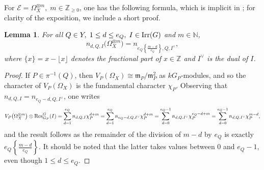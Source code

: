 \documentclass[10pt]{amsart}
\newtheorem{lemma}[theorem]{Lemma}
\theoremstyle{definition}
\begin{document}
 For $\mathcal{E}=\Omega_X^{\otimes m},\;m\in\mathbb{Z}_{\geq 0}$, one has the following formula, which is 
implicit in \cite[3.9]{MR589254}; for clarity of the exposition, we include a short proof.
\begin{lemma}\label{lem:nomega}
For all $Q\in Y,\;1\leq d\leq e_Q,\; I\in{\rm Irr}(G)$ and $m\in\mathbb{N}$,
\[
n_{d,Q,I}\big(\Omega_X^{\otimes m}\big)=n_{e_Q\left\{\frac{m-d}{e_Q}\right\},Q,I^\vee},
\]
where $\{ x\}=x-\lfloor x \rfloor$ denotes the fractional part of $x\in\mathbb{Z}$ and $I^\vee$ is the dual of $I$.
\end{lemma}
\begin{proof}
If $P\in \pi^{-1}(Q)$, then $V_P(\Omega_X)\cong \mathfrak{m}_P/\mathfrak{m}_P^2$ as $kG_P$-modules, and so the character of $V_P(\Omega_X)$ is the fundamental character $\chi_P$. Observing that $n_{d,Q,I}=n_{e_Q-d,Q,I^{\vee}}$, one writes
\[
V_P\big(\Omega_X^{\otimes m}\big )\otimes {\rm Res}^G_{G_P}(I)=
\sum_{d=1}^{e_Q}n_{d,Q,I}\chi_P^{d+m}=
\sum_{d=1}^{e_Q}n_{e_Q-d,Q,I^\vee}\chi_P^{d+m}=
\sum_{d=0}^{e_Q-1}n_{d,Q,I^\vee}\chi_P^{e_Q-d+m}=
\sum_{d=0}^{e_Q-1}n_{d,Q,I^\vee}\chi_P^{m-d},
\]
and the result follows as the remainder of the division of $m-d$ by $e_Q$ is exactly $e_Q\left\{\frac{m-d}{e_Q}\right\}$. It should be noted that the latter takes values between $0$ and $e_Q-1$, even though $1\leq d\leq e_Q$.
\end{proof}

\vspace{3mm}

\end{document}

